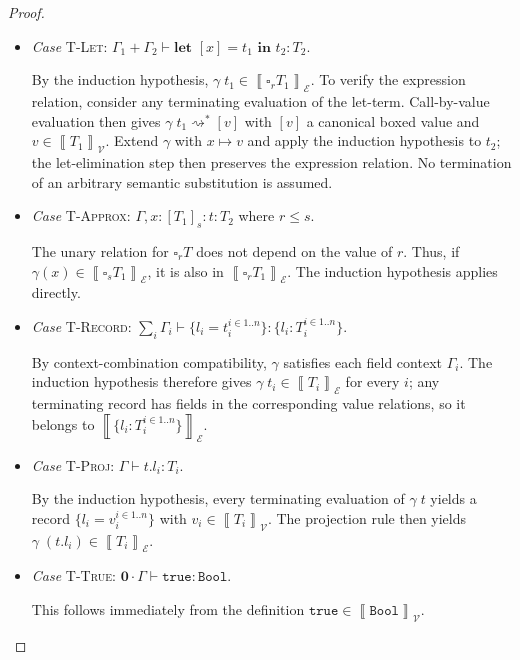\documentclass[conference]{IEEEtran}
\newcommand\unp[3]{\textbf{let }[#1]=#2\textbf{ in }#3}
\newcommand\gradedt[2]{\square_{#1} #2}
\newcommand\true{\texttt{true}}
\newcommand\bool{\texttt{Bool}}
\newcommand\srzero{\textbf{0}}
\newcommand\reduce{\rightsquigarrow}
\newcommand\calv{\mathcal{V}}
\newcommand\cale{\mathcal{E}}
\newcommand\bbrac[1]{\left\llbracket #1\right\rrbracket}
\begin{document}
\begin{proof}
\begin{itemize}
		By the induction hypothesis, $\gamma\; t\in\bbrac{T}_\cale$. Evaluation compatibility gives $[\gamma\;t]\reduce^*[v]$ whenever $\gamma\;t\reduce^*v$ with $v\in\bbrac{T}_\calv$; hence the boxed term is in $\bbrac{\gradedt{r}{T}}_\cale$.
		
		\item \emph{Case} \textsc{T-Let}: $\Gamma_1+\Gamma_2\vdash\unp{x}{t_1}{t_2}:T_2$.
		
		By the induction hypothesis, $\gamma\; t_1\in\bbrac{\gradedt{r}{T_1}}_\cale$. To verify the expression relation, consider any terminating evaluation of the let-term. Call-by-value evaluation then gives $\gamma\;t_1\reduce^*[v]$ with $[v]$ a canonical boxed value and $v\in\bbrac{T_1}_\calv$. Extend $\gamma$ with $x\mapsto v$ and apply the induction hypothesis to $t_2$; the let-elimination step then preserves the expression relation. No termination of an arbitrary semantic substitution is assumed.
		
		\item \emph{Case} \textsc{T-Approx}: $\Gamma,x:[T_1]_s:t:T_2$ where $r\le s$.
		
		The unary relation for $\gradedt{r}{T}$ does not depend on the value of $r$. Thus, if $\gamma(x)\in\bbrac{\gradedt{s}{T_1}}_\cale$, it is also in $\bbrac{\gradedt{r}{T_1}}_\cale$. The induction hypothesis applies directly.
		
		\item \emph{Case} \textsc{T-Record}: $\sum_i\Gamma_i\vdash\{l_i=t_i^{i\in 1..n}\}:\{l_i:T_i^{i\in 1..n}\}$.
		
		By context-combination compatibility, $\gamma$ satisfies each field context $\Gamma_i$. The induction hypothesis therefore gives $\gamma\; t_i\in\bbrac{T_i}_\cale$ for every $i$; any terminating record has fields in the corresponding value relations, so it belongs to $\bbrac{\{l_i:T_i^{i\in 1..n}\}}_\cale$.
		
		\item \emph{Case} \textsc{T-Proj}: $\Gamma\vdash t.l_i:T_i$.
		
		By the induction hypothesis, every terminating evaluation of $\gamma\;t$ yields a record $\{l_i=v_i^{i\in 1..n}\}$ with $v_i\in\bbrac{T_i}_\calv$. The projection rule then yields $\gamma\;(t.l_i)\in\bbrac{T_i}_\cale$.
		
		\item \emph{Case} \textsc{T-True}: $\srzero\cdot\Gamma\vdash\true:\bool$.
		
		This follows immediately from the definition $\true\in\bbrac{\bool}_\calv$.
		

\end{itemize}
\end{proof}
\end{document}
